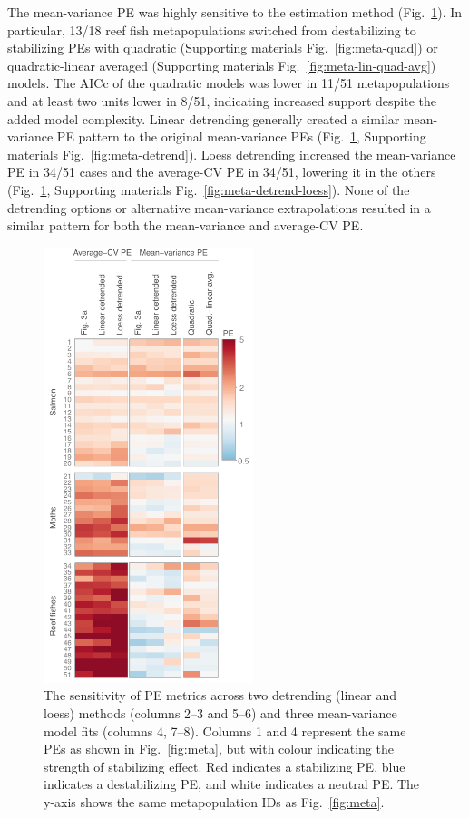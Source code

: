 The mean-variance PE was highly sensitive to the estimation method
(Fig.~\ref{fig:detrend}). In particular,
13/18 reef fish metapopulations
switched from destabilizing to stabilizing PEs with quadratic
(Supporting materials Fig.~\ref{fig:meta-quad}) or quadratic-linear averaged
(Supporting materials Fig.~\ref{fig:meta-lin-quad-avg}) models. The AICc of the quadratic models was
lower in 11/51 metapopulations and at least two
units lower in 8/51, indicating
increased support despite the added model complexity. Linear
detrending generally created a similar mean-variance PE pattern to the original
mean-variance PEs (Fig.~\ref{fig:detrend}, Supporting materials Fig.\ \ref{fig:meta-detrend}). Loess
detrending increased the mean-variance PE in
34/51 cases and the average-CV PE
in 34/51, lowering it in the
others (Fig.~\ref{fig:detrend}, Supporting materials Fig.~\ref{fig:meta-detrend-loess}). None of the
detrending options or alternative mean-variance extrapolations resulted in a
similar pattern for both the mean-variance and average-CV PE.

\begin{figure}[htbp]
  \centering \includegraphics[height=5in]{prophets/fig4}
  \caption[The sensitivity of PE metrics across two detrending methods and three mean-variance model fits.]{
  The sensitivity of PE metrics across two detrending (linear and
    loess) methods (columns 2--3 and 5--6) and three mean-variance model fits
    (columns 4, 7--8). Columns 1 and 4 represent the same PEs as shown in
    Fig.~\ref{fig:meta}, but with colour indicating the strength of stabilizing
    effect. Red indicates a stabilizing PE, blue indicates a destabilizing PE,
    and white indicates a neutral PE. The y-axis shows the same metapopulation
    IDs as Fig.~\ref{fig:meta}.
  }
  \label{fig:detrend}
\end{figure}




